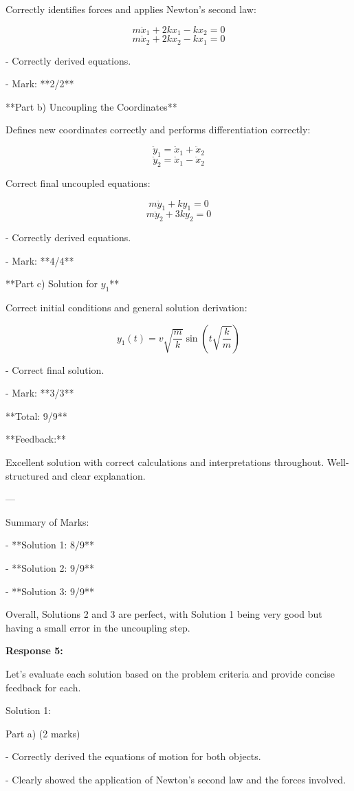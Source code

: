 \documentclass[a4paper,11pt]{article}
\begin{document}
Correctly identifies forces and applies Newton's second law:

\[ m \ddot{x}_{1} + 2kx_{1} - kx_{2} = 0 \]
\[ m \ddot{x}_{2} + 2kx_{2} - kx_{1} = 0 \]

- Correctly derived equations.

- Mark: **2/2**

**Part b) Uncoupling the Coordinates**

Defines new coordinates correctly and performs differentiation correctly:

\[ \ddot{y}_{1} = \ddot{x}_{1} + \ddot{x}_{2} \]
\[ \ddot{y}_{2} = \ddot{x}_{1} - \ddot{x}_{2} \]

Correct final uncoupled equations:

\[ m \ddot{y}_{1} + ky_{1} = 0 \]
\[ m \ddot{y}_{2} + 3ky_{2} = 0 \]

- Correctly derived equations.

- Mark: **4/4**

**Part c) Solution for \( y_{1} \)**

Correct initial conditions and general solution derivation:

\[ y_{1}(t) = v \sqrt{\frac{m}{k}} \sin(t \sqrt{\frac{k}{m}}) \]

- Correct final solution.

- Mark: **3/3**

**Total: 9/9**

**Feedback:**

Excellent solution with correct calculations and interpretations throughout. Well-structured and clear explanation.

---

Summary of Marks:

- **Solution 1: 8/9**

- **Solution 2: 9/9**

- **Solution 3: 9/9**

Overall, Solutions 2 and 3 are perfect, with Solution 1 being very good but having a small error in the uncoupling step.

\bigskip
\textbf{Response 5:}

Let's evaluate each solution based on the problem criteria and provide concise feedback for each.

Solution 1:

Part a) (2 marks)

- Correctly derived the equations of motion for both objects.

- Clearly showed the application of Newton's second law and the forces involved.
\end{document}
